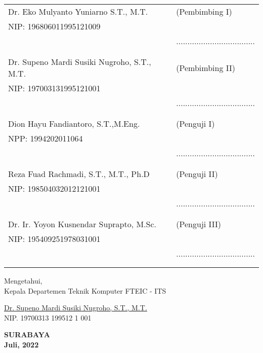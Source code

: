 \noindent
\begin{tabularx}{\textwidth}{X l}
	Dr. Eko Mulyanto Yuniarno S.T., M.T.          & (Pembimbing I) \\
	NIP: 196806011995121009        & \\
	& ................................... \\
	&  \\
	&  \\
	Dr. Supeno Mardi Susiki Nugroho, S.T., M.T.     & (Pembimbing II) \\
	NIP: 197003131995121001        & \\
	& ................................... \\
	&  \\
	&  \\
	Dion Hayu Fandiantoro, S.T.,M.Eng.  & (Penguji I) \\
	NPP: 1994202011064        & \\
	& ................................... \\
	&  \\
	&  \\
	Reza Fuad Rachmadi, S.T., M.T., Ph.D  & (Penguji II) \\
	NIP: 198504032012121001        & \\
	& ................................... \\
	&  \\
	&  \\
	Dr. Ir. Yoyon Kusnendar Suprapto, M.Sc.             & (Penguji III) \\
	NIP: 195409251978031001        & \\
	& ................................... \\
	&  \\
	&  \\
\end{tabularx}
\endgroup


\begin{center}
	Mengetahui, \\
	Kepala Departemen Teknik Komputer FTEIC - ITS\\
	
	\vspace{8ex}
	
	\underline{Dr. Supeno Mardi Susiki Nugroho, S.T., M.T.} \\
	NIP. 19700313 199512 1 001
\end{center}

\begin{center}
	\textbf{SURABAYA\\Juli, 2022}
\end{center}
\endgroup
